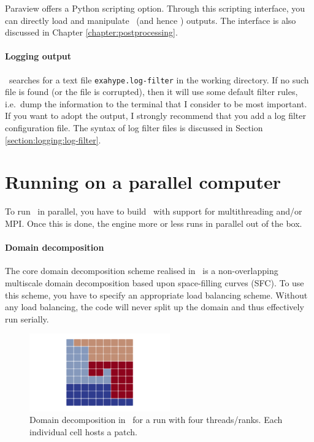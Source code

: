 Paraview offers a Python scripting option. 
Through this scripting interface, you can directly load and manipulate \Peano\
(and hence \ExaHyPE) outputs. 
The interface is also discussed in Chapter
\ref{chapter:postprocessing}.


\paragraph{Logging output}

\ExaHyPE\ searches for a text file \texttt{exahype.log-filter} in the working
directory.
If no such file is found (or the file is corrupted), then it will use some
default filter rules, i.e.~dump the information to the terminal that I consider
to be most important.
If you want to adopt the output, I strongly recommend that you add a log filter
configuration file. 
The syntax of log filter files is discussed in Section
\ref{section:logging:log-filter}.



\section{Running on a parallel computer}

To run \ExaHyPE\ in parallel, you have to build \Peano\ with support for
multithreading and/or MPI.
Once this is done, the engine more or less runs in parallel out of the box.


\paragraph{Domain decomposition}
The core domain decomposition scheme realised in \ExaHyPE\ is a non-overlapping
multiscale domain decomposition based upon space-filling curves (SFC).
To use this scheme, you have to specify an appropriate load balancing scheme.
Without any load balancing, the code will never split up the domain and thus
effectively run serially.

\begin{figure}
 \begin{center}
  \includegraphics[width=0.54\textwidth]{60_exahype/domain-decomposition.png}
 \end{center}
 \caption{
  Domain decomposition in \ExaHyPE\ for a run with four threads/ranks. Each
  individual cell hosts a patch.
 }
\end{figure}


